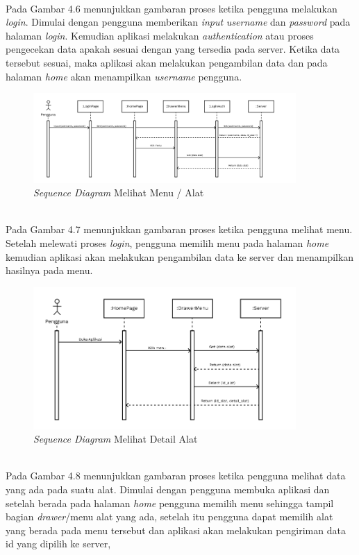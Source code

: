 \begin{flushleft}
\begin{justify}
\begin{enumerate}[label=\alph*.]
            \\Pada Gambar 4.6 menunjukkan gambaran proses ketika pengguna melakukan \emph{login}. Dimulai dengan pengguna memberikan \emph{input} \emph{username} dan \emph{password} pada halaman \emph{login}. Kemudian aplikasi melakukan \emph{authentication} atau proses pengecekan data apakah sesuai dengan yang tersedia pada server. Ketika data tersebut sesuai, maka aplikasi akan melakukan pengambilan data dan pada halaman \emph{home}
            akan menampilkan \emph{username} pengguna.\\
            \begin{figure}[ht]
                \centering
                \includegraphics[width=10cm]{images/bab 4/buka menu alat.png}
                \caption{\textit{Sequence Diagram} Melihat Menu / Alat}
            \end{figure}
            \\Pada Gambar 4.7 menunjukkan gambaran proses ketika pengguna melihat menu. Setelah melewati proses \emph{login}, pengguna memilih menu pada halaman \emph{home} kemudian aplikasi akan melakukan pengambilan data ke server dan menampilkan hasilnya pada menu.
            \begin{figure}[ht]
                \centering
                \includegraphics[width=10cm]{images/bab 4/Sequence buka detail alat.png}
                \caption{\textit{Sequence Diagram} Melihat Detail Alat}
            \end{figure}
            \\Pada Gambar 4.8 menunjukkan gambaran proses ketika pengguna melihat data yang ada pada suatu alat. Dimulai dengan pengguna membuka aplikasi dan setelah berada pada halaman \emph{home} pengguna memilih menu sehingga tampil bagian \emph{drawer}/menu alat yang ada, setelah itu pengguna dapat memilih alat yang berada pada menu tersebut dan aplikasi akan melakukan pengiriman data id yang dipilih ke server, 

\end{enumerate}
\end{justify}
\end{flushleft}
